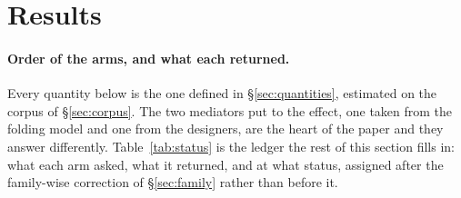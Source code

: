 \documentclass[11pt]{article}
\begin{document}
\section{Results}
\label{sec:results}

\paragraph{Order of the arms, and what each returned.} Every quantity below is the one defined in
\S\ref{sec:quantities}, estimated on the corpus of \S\ref{sec:corpus}. The two mediators put to the
effect, one taken from the folding model and one from the designers, are the heart of the paper and
they answer differently. Table~\ref{tab:status} is the ledger the rest of this section fills in:
what each arm asked, what it returned, and at what status, assigned after the family-wise correction
of \S\ref{sec:family} rather than before it.
\end{document}
